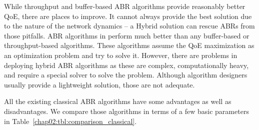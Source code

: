 While throughput and buffer-based ABR algorithms provide reasonably better QoE, there are places to improve. It cannot always provide the best solution due to the nature of the network dynamics -- a Hybrid solution can rescue ABRs from those pitfalls. ABR algorithms in \cite{7247436,140405,yin2015control,10.1145/2670518.2673877} perform much better than any buffer-based or throughput-based algorithms. These algorithms assume the QoE maximization as an optimization problem and try to solve it. However, there are problems in deploying hybrid ABR algorithms as these are complex, computationally heavy, and require a special solver to solve the problem. Although algorithm designers usually provide a lightweight solution, those are not adequate.

All the existing classical ABR algorithms have some advantages as well as disadvantages. We compare those algorithms in terms of a few basic parameters in Table~\ref{chap02:tbl:comparison_classical}.

